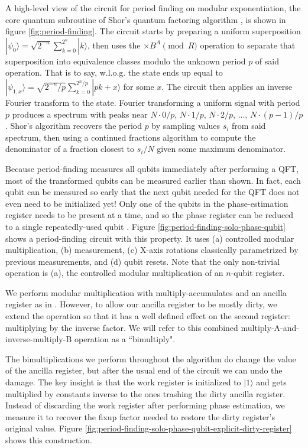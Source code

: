 \documentclass[twocolumn]{article}
\begin{document}
A high-level view of the circuit for period finding on modular exponentiation, the core quantum subroutine of Shor's quantum factoring algorithm \cite{Shor1999}, is shown in figure \ref{fig:period-finding}.
The circuit starts by preparing a uniform superposition $|\psi_0\rangle = \sqrt{2^{-n}} \sum_{k=0}^{2^n} |k\rangle$, then uses the $\times B^A {\pmod R}$ operation to separate that superposition into equivalence classes modulo the unknown period $p$ of said operation.
That is to say, w.l.o.g. the state ends up equal to $|\psi_{1,x}\rangle = \sqrt{2^{-n}/p} \sum_{k=0}^{2^n/p} |pk + x \rangle$ for some $x$.
The circuit then applies an inverse Fourier transform to the state.
Fourier transforming a uniform signal with period $p$ produces a spectrum with peaks near $N \cdot 0/p$, $N \cdot 1/p$, $N \cdot 2/p$, ..., $N \cdot (p-1)/p$.
Shor's algorithm recovers the period $p$ by sampling values $s_i$ from said spectrum, then using a continued fractions algorithm to compute the denominator of a fraction closest to $s_i/N$ given some maximum denominator.

Because period-finding measures all qubits immediately after performing a QFT, most of the transformed qubits can be measured earlier than shown.
In fact, each qubit can be measured so early that the next qubit needed for the QFT does not even need to be initialized yet!
Only one of the qubits in the phase-estimation register needs to be present at a time, and so the phase register can be reduced to a single repeatedly-used qubit \cite{beauregard2003}.
Figure \ref{fig:period-finding-solo-phase-qubit} shows a period-finding circuit with this property.
It uses (a) controlled modular multiplication, (b) measurement, (c) X-axis rotations classically parametrized by previous measurements, and (d) qubit resets.
Note that the only non-trivial operation is (a), the controlled modular multiplication of an $n$-qubit register.

We perform modular multiplication with multiply-accumulates and an ancilla register as in \cite{beauregard2003}.
However, to allow our ancilla register to be mostly dirty, we extend the operation so that it has a well defined effect on the second register: multiplying by the inverse factor.
We will refer to this combined multiply-A-and-inverse-multiply-B operation as a ``bimultiply".

The bimultiplications we perform throughout the algorithm do change the value of the ancilla register, but after the usual end of the circuit we can undo the damage.
The key insight is that the work register is initialized to $|1\rangle$ and gets multiplied by constants inverse to the ones trashing the dirty ancilla register.
Instead of discarding the work register after performing phase estimation, we measure it to recover the fixup factor needed to restore the dirty register's original value.
Figure \ref{fig:period-finding-solo-phase-qubit-explicit-dirty-register} shows this construction.
\end{document}
